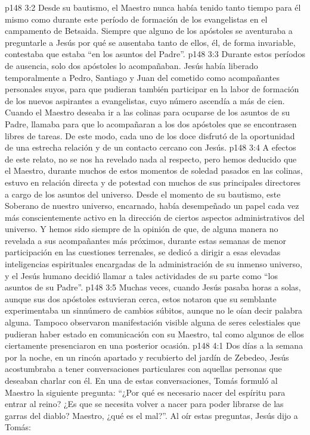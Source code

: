 \vs p148 3:2 Desde su bautismo, el Maestro nunca había tenido tanto tiempo para él mismo como durante este período de formación de los evangelistas en el campamento de Betsaida. Siempre que alguno de los apóstoles se aventuraba a preguntarle a Jesús por qué se ausentaba tanto de ellos, él, de forma invariable, contestaba que estaba “en los asuntos del Padre”.
\vs p148 3:3 Durante estos períodos de ausencia, solo dos apóstoles lo acompañaban. Jesús había liberado temporalmente a Pedro, Santiago y Juan del cometido como acompañantes personales suyos, para que pudieran también participar en la labor de formación de los nuevos aspirantes a evangelistas, cuyo número ascendía a más de cien. Cuando el Maestro deseaba ir a las colinas para ocuparse de los asuntos de su Padre, llamaba para que lo acompañaran a los dos apóstoles que se encontrasen libres de tareas. De este modo, cada uno de los doce disfrutó de la oportunidad de una estrecha relación y de un contacto cercano con Jesús.
\vs p148 3:4 A efectos de este relato, no se nos ha revelado nada al respecto, pero hemos deducido que el Maestro, durante muchos de estos momentos de soledad pasados en las colinas, estuvo en relación directa y de potestad con muchos de sus principales directores a cargo de los asuntos del universo. Desde el momento de su bautismo, este Soberano de nuestro universo, encarnado, había desempeñado un papel cada vez más conscientemente activo en la dirección de ciertos aspectos administrativos del universo. Y hemos sido siempre de la opinión de que, de alguna manera no revelada a sus acompañantes más próximos, durante estas semanas de menor participación en las cuestiones terrenales, se dedicó a dirigir a esas elevadas inteligencias espirituales encargadas de la administración de su inmenso universo, y el Jesús humano decidió llamar a tales actividades de su parte como “los asuntos de su Padre”.
\vs p148 3:5 Muchas veces, cuando Jesús pasaba horas a solas, aunque sus dos apóstoles estuvieran cerca, estos notaron que su semblante experimentaba un sinnúmero de cambios súbitos, aunque no le oían decir palabra alguna. Tampoco observaron manifestación visible alguna de seres celestiales que pudieran haber estado en comunicación con su Maestro, tal como algunos de ellos ciertamente presenciaron en una posterior ocasión.
\vs p148 4:1 Dos días a la semana por la noche, en un rincón apartado y recubierto del jardín de Zebedeo, Jesús acostumbraba a tener conversaciones particulares con aquellas personas que deseaban charlar con él. En una de estas conversaciones, Tomás formuló al Maestro la siguiente pregunta: “¿Por qué es necesario nacer del espíritu para entrar al reino? ¿Es que se necesita volver a nacer para poder librarse de las garras del diablo? Maestro, ¿qué es el mal?”. Al oír estas preguntas, Jesús dijo a Tomás:
